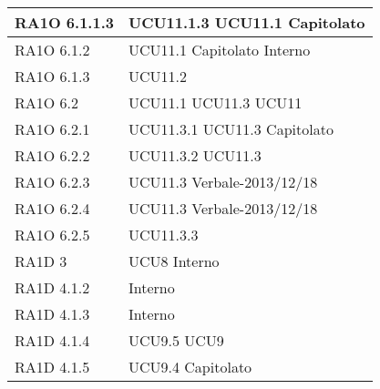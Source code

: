 \begin{center}
\begin{longtable}{ | p{5cm} | p{5cm} |}
        RA1O 6.1.1.3  &  UCU11.1.3 \newline  UCU11.1 \newline  Capitolato \newline  \\ \hline      
        RA1O 6.1.2  &  UCU11.1 \newline  Capitolato \newline  Interno \newline  \\ \hline      
        RA1O 6.1.3  &  UCU11.2 \newline  \\ \hline      
        RA1O 6.2  &  UCU11.1 \newline  UCU11.3 \newline  UCU11 \newline  \\ \hline      
        RA1O 6.2.1 &  UCU11.3.1 \newline  UCU11.3 \newline  Capitolato \newline  \\ \hline      
        RA1O 6.2.2 &  UCU11.3.2 \newline  UCU11.3 \newline  \\ \hline      
        RA1O 6.2.3 &  UCU11.3 \newline  Verbale-2013/12/18 \newline  \\ \hline      
        RA1O 6.2.4 &  UCU11.3 \newline  Verbale-2013/12/18 \newline  \\ \hline      
        RA1O 6.2.5 &  UCU11.3.3 \newline  \\ \hline      
        RA1D 3  &  UCU8 \newline  Interno \newline  \\ \hline      
        RA1D 4.1.2  &  Interno \newline  \\ \hline      
        RA1D 4.1.3  &  Interno \newline  \\ \hline      
        RA1D 4.1.4  &  UCU9.5 \newline  UCU9 \newline  \\ \hline      
        RA1D 4.1.5 &  UCU9.4 \newline  Capitolato \newline  \\ \hline      

\end{longtable}
\end{center}

